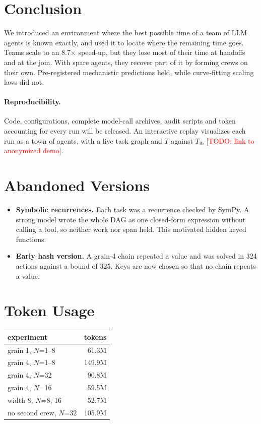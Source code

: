 \documentclass[10pt,twocolumn]{article}
\newcommand{\todo}[1]{\textcolor{red}{[TODO: #1]}}
\newcommand{\Tlb}{T_{\mathrm{lb}}}
\begin{document}
\section{Conclusion}
We introduced an environment where the best possible time of a team of LLM agents is known exactly, and used it to locate where the remaining time goes.
Teams scale to an 8.7$\times$ speed-up, but they lose most of their time at handoffs and at the join.
With spare agents, they recover part of it by forming crews on their own.
Pre-registered mechanistic predictions held, while curve-fitting scaling laws did not.

\paragraph{Reproducibility.}
Code, configurations, complete model-call archives, audit scripts and token accounting for every run will be released.
An interactive replay visualizes each run as a town of agents, with a live task graph and $T$ against $\Tlb$ \todo{link to anonymized demo}.




\appendix
\section{Abandoned Versions}
\label{app:history}
\begin{itemize}\setlength\itemsep{1pt}
\item \textbf{Symbolic recurrences.} Each task was a recurrence checked by SymPy. A strong model wrote the whole DAG as one closed-form expression without calling a tool, so neither work nor span held. This motivated hidden keyed functions.
\item \textbf{Early hash version.} A grain-4 chain repeated a value and was solved in 324 actions against a bound of 325. Keys are now chosen so that no chain repeats a value.
\end{itemize}

\section{Token Usage}
\begin{table}[h]
\centering\small
\begin{tabular}{@{}lr@{}}
\toprule
experiment & tokens \\
\midrule
grain 1, $N$=1--8 & 61.3M \\
grain 4, $N$=1--8 & 149.9M \\
grain 4, $N$=32 & 90.8M \\
grain 4, $N$=16 & 59.5M \\
width 8, $N$=8, 16 & 52.7M \\
no second crew, $N$=32 & 105.9M \\
\bottomrule
\end{tabular}
\end{table}
\end{document}
